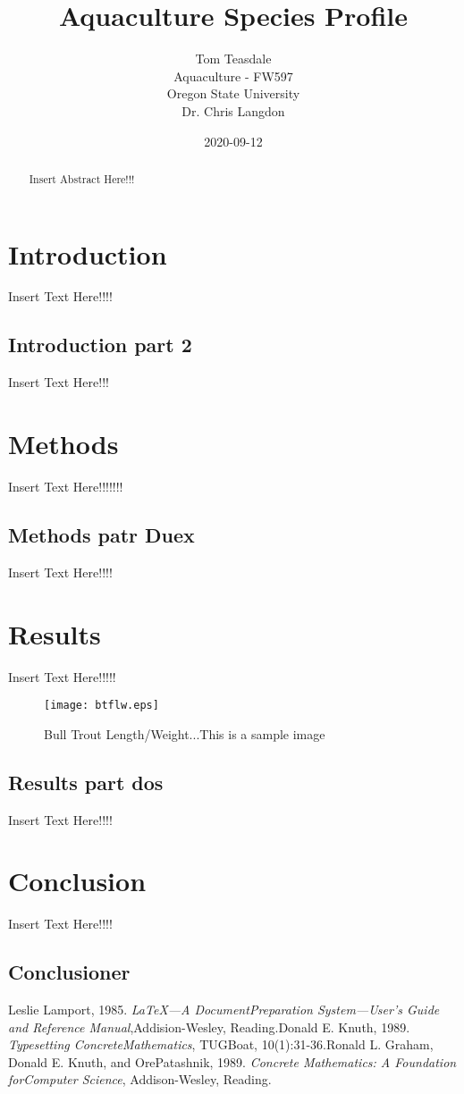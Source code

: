 \documentclass[12pt]{article}
\title{Aquaculture Species Profile}
\date{2020-09-12}
\author{Tom Teasdale\\
	Aquaculture -  FW597\\
	Oregon State University\\
	Dr. Chris Langdon}
\begin{document}
	\maketitle
\newpage
\tableofcontents
\newpage
\begin{abstract}
Insert Abstract Here!!!
\end{abstract}
\newpage
{}
\section{Introduction}
Insert Text Here!!!!
\subsection{Introduction part 2}
Insert Text Here!!!
\section{Methods}
Insert Text Here!!!!!!!
\subsection{Methods patr Duex}
Insert Text Here!!!!
\section{Results}
Insert Text Here!!!!!
\begin{figure}
\begin{center}
\texttt{[image: btflw.eps]}
\caption{Bull Trout Length/Weight...This is a sample image}
\end{center}
\end{figure}
\subsection{Results part dos}
Insert Text Here!!!!
\section{Conclusion}
Insert Text Here!!!!
\subsection{Conclusioner}
\newpage
\begin{thebibliography}{9}Leslie Lamport, 1985. \emph{\LaTeX---A DocumentPreparation System---User’s Guide and Reference Manual},Addision-Wesley, Reading.Donald E. Knuth, 1989. \emph{Typesetting ConcreteMathematics}, TUGBoat, 10(1):31-36.Ronald L. Graham, Donald E. Knuth, and OrePatashnik, 1989. \emph{Concrete Mathematics: A Foundation forComputer Science}, Addison-Wesley, Reading.\end{thebibliography}
\end{document}
